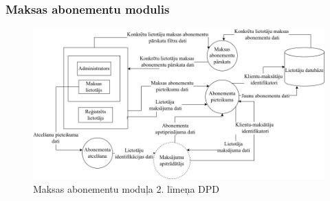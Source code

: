 \clearpage
\subsubsection{Maksas abonementu modulis}

\begin{figure}[htbp]
	\centering
	\includegraphics[width=\linewidth]{./src/img/MaksasAbonementaModuls.png}
	\caption{Maksas abonementu moduļa 2. līmeņa DPD}
	\label{fig:dpd-2-premium-user}
\end{figure}




